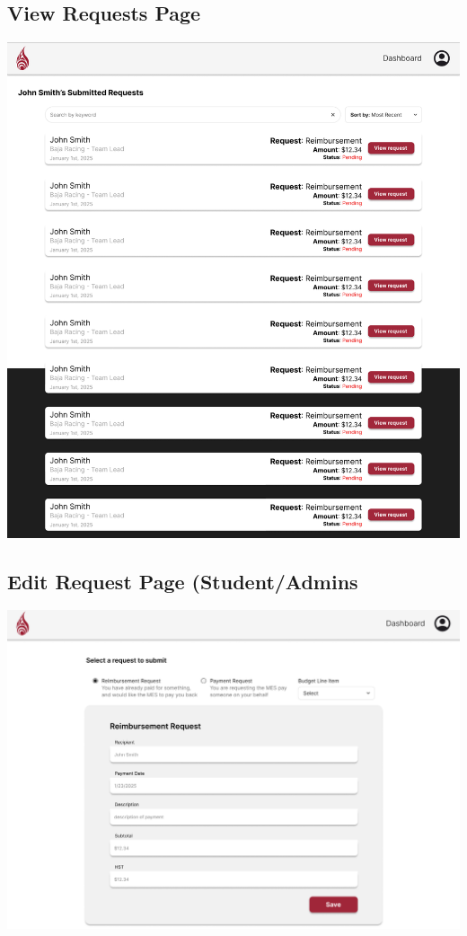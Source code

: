 \documentclass[12pt, titlepage]{article}
\begin{document}
\subsection{View Requests Page}
\includegraphics[]{imgs/ViewRequestsPage.png}

\subsection{Edit Request Page (Student/Admins}
\includegraphics[]{imgs/EditRequestPage.png}
\end{document}
